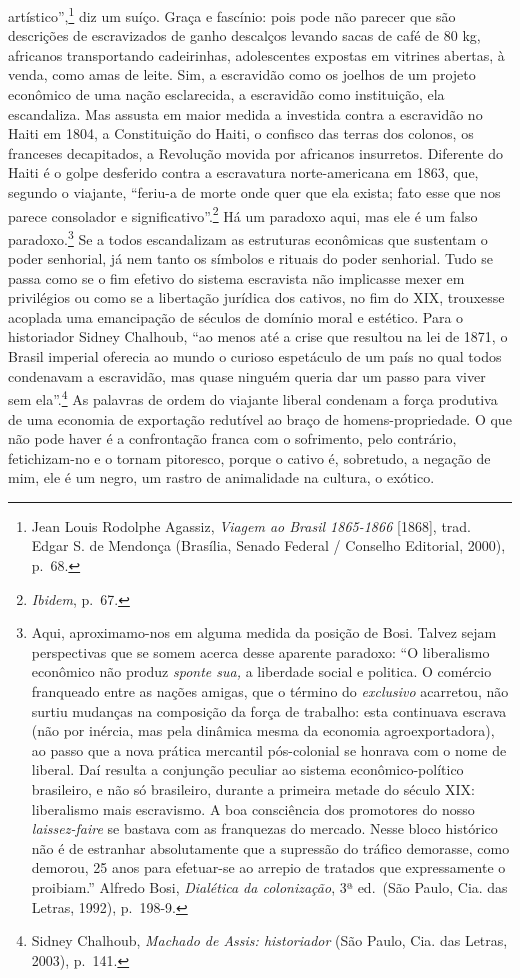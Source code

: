 artístico'',\footnote{Jean Louis Rodolphe Agassiz, \emph{Viagem ao
  Brasil 1865-1866} {[}1868{]}, trad. Edgar S. de Mendonça (Brasília,
  Senado Federal / Conselho Editorial, 2000), p.~68.} diz um suíço.
Graça e fascínio: pois pode não parecer que são descrições de
escravizados de ganho descalços levando sacas de café de 80 kg,
africanos transportando cadeirinhas, adolescentes expostas em vitrines
abertas, à venda, como amas de leite. Sim, a escravidão como os joelhos
de um projeto econômico de uma nação esclarecida, a escravidão como
instituição, ela escandaliza. Mas assusta em maior medida a investida
contra a escravidão no Haiti em 1804, a Constituição do Haiti, o
confisco das terras dos colonos, os franceses decapitados, a Revolução
movida por africanos insurretos. Diferente do Haiti é o golpe desferido
contra a escravatura norte-americana em 1863, que, segundo o viajante,
``feriu-a de morte onde quer que ela exista; fato esse que nos parece
consolador e significativo''.\footnote{\emph{Ibidem}, p.~67.} Há um
paradoxo aqui, mas ele é um falso paradoxo.\footnote{Aqui,
  aproximamo-nos em alguma medida da posição de Bosi. Talvez sejam
  perspectivas que se somem acerca desse aparente paradoxo: ``O
  liberalismo econômico não produz \emph{sponte sua,} a liberdade social
  e politica. O comércio franqueado entre as nações amigas, que o
  término do \emph{exclusivo} acarretou, não surtiu mudanças na
  composição da força de trabalho: esta continuava escrava (não por
  inércia, mas pela dinâmica mesma da economia agroexportadora), ao
  passo que a nova prática mercantil pós-colonial se honrava com o nome
  de liberal. Daí resulta a conjunção peculiar ao sistema
  econômico-político brasileiro, e não só brasileiro, durante a primeira
  metade do século XIX: liberalismo mais escravismo. A boa consciência
  dos promotores do nosso \emph{laissez-faire} se bastava com as
  franquezas do mercado. Nesse bloco histórico não é de estranhar
  absolutamente que a supressão do tráfico demorasse, como demorou, 25
  anos para efetuar-se ao arrepio de tratados que expressamente o
  proibiam.'' Alfredo Bosi, \emph{Dialética da colonização}, 3ª ed.~(São
  Paulo, Cia. das Letras, 1992), p.~198-9.} Se a todos escandalizam as
estruturas econômicas que sustentam o poder senhorial, já nem tanto os
símbolos e rituais do poder senhorial. Tudo se passa como se o fim
efetivo do sistema escravista não implicasse mexer em privilégios ou
como se a libertação jurídica dos cativos, no fim do XIX, trouxesse
acoplada uma emancipação de séculos de domínio moral e estético. Para o
historiador Sidney Chalhoub, ``ao menos até a crise que resultou na lei
de 1871, o Brasil imperial oferecia ao mundo o curioso espetáculo de um
país no qual todos condenavam a escravidão, mas quase ninguém queria dar
um passo para viver sem ela''.\footnote{Sidney Chalhoub, \emph{Machado
  de Assis: historiador} (São Paulo, Cia. das Letras, 2003), p.~141.} As
palavras de ordem do viajante liberal condenam a força produtiva de uma
economia de exportação redutível ao braço de homens-propriedade. O que
não pode haver é a confrontação franca com o sofrimento, pelo contrário,
fetichizam-no e o tornam pitoresco, porque o cativo é, sobretudo, a
negação de mim, ele é um negro, um rastro de animalidade na cultura, o
exótico.

